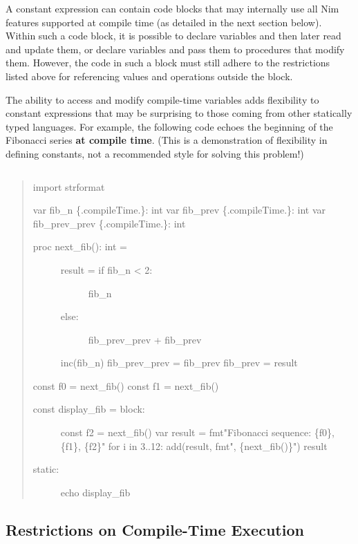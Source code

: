 A constant expression can contain code blocks that may internally use
all Nim features supported at compile time (as detailed in the next
section below). Within such a code block, it is possible to declare
variables and then later read and update them, or declare variables and
pass them to procedures that modify them. However, the code in such a
block must still adhere to the restrictions listed above for referencing
values and operations outside the block.

The ability to access and modify compile-time variables adds flexibility
to constant expressions that may be surprising to those coming from
other statically typed languages. For example, the following code echoes
the beginning of the Fibonacci series \textbf{at compile time}. (This is
a demonstration of flexibility in defining constants, not a recommended
style for solving this problem!)

\begin{verbatim}
\end{verbatim}

\begin{quote}
import strformat

var fib\_n \{.compileTime.\}: int var fib\_prev \{.compileTime.\}: int
var fib\_prev\_prev \{.compileTime.\}: int

\begin{description}
\item[proc next\_fib(): int =]
\begin{description}
\item[result = if fib\_n \textless{} 2:]
fib\_n
\item[else:]
fib\_prev\_prev + fib\_prev
\end{description}

inc(fib\_n) fib\_prev\_prev = fib\_prev fib\_prev = result
\end{description}

const f0 = next\_fib() const f1 = next\_fib()

\begin{description}
\item[const display\_fib = block:]
const f2 = next\_fib() var result = fmt"Fibonacci sequence: \{f0\},
\{f1\}, \{f2\}" for i in 3..12: add(result, fmt", \{next\_fib()\}")
result
\item[static:]
echo display\_fib
\end{description}
\end{quote}

\hypertarget{restrictions-on-compile-time-execution}{%
\subsection{Restrictions on Compile-Time
Execution}\label{restrictions-on-compile-time-execution}}

